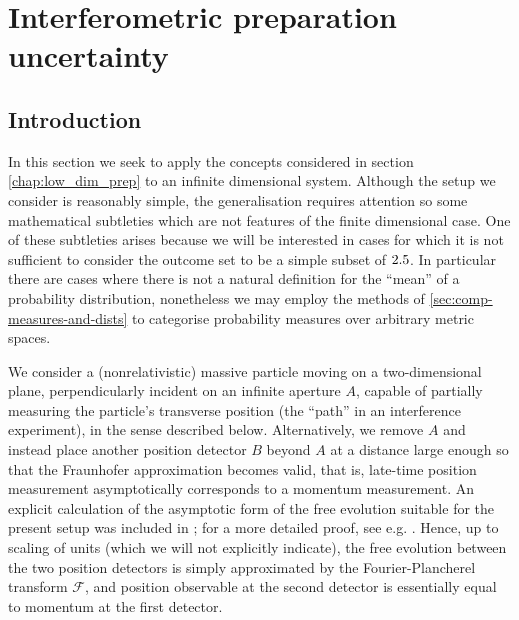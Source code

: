 \chapter{Interferometric preparation uncertainty}\label{chap:interferometric_prep_ur}

\section{Introduction} 

In this section we seek to apply the concepts considered in section \ref{chap:low_dim_prep} to an infinite dimensional system. Although the setup we consider is reasonably simple, the generalisation requires attention so some mathematical subtleties which are not features of the finite dimensional case. One of these subtleties arises because we will be interested in cases for which it is not sufficient to consider the outcome set to be a simple subset of $2.5$. In particular there are cases where there is not a natural definition for the ``mean'' of a probability distribution, nonetheless we may employ the methods of \ref{sec:comp-measures-and-dists} to categorise probability measures over arbitrary metric spaces.

We consider a (nonrelativistic) massive particle moving on a two-dimensional plane, perpendicularly incident on an infinite aperture $A$, capable of partially measuring the particle's transverse position (the ``path'' in an interference experiment), in the sense described below. Alternatively, we remove $A$ and instead place another position detector $B$ beyond $A$ at a distance large 
enough so that the Fraunhofer approximation becomes valid, that is, late-time position measurement asymptotically corresponds to a momentum measurement. An explicit calculation of the asymptotic form of the free evolution suitable for the present setup was included in \cite{BB2013}; for a more detailed proof, see e.g. \cite[Theorem IX.31]{RSII}. Hence, up to scaling of units (which we will not explicitly indicate), the free evolution between the two position detectors is simply approximated by the Fourier-Plancherel transform $\mathcal F$, and position observable at the second detector is essentially equal to momentum at the first detector.

